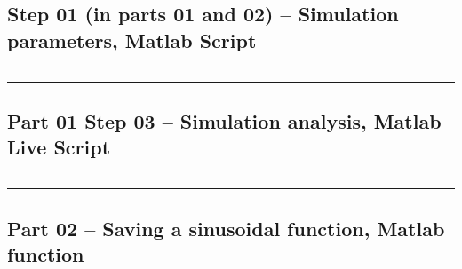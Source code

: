 \documentclass[12pt]{article}
\def\hr{{\par\noindent\rule{\textwidth}{0.4pt}}}
\begin{document}
\subsection{Step 01 (in parts 01 and 02) -- Simulation parameters, Matlab Script}\label{sap:simulation params}
\inputminted{matlab}{step01_simulation_params.m}

\hr

\subsection{Part 01 Step 03 -- Simulation analysis, Matlab Live Script}\label{sap:simulation analysis mlx}
\inputminted{matlab}{step03_simulation_analysis_mlx.m}

\hr

\subsection{Part 02 -- Saving a sinusoidal function, Matlab function}\label{sap:save sinusoid}
\inputminted{matlab}{part02_save_sinusoid.m}
\end{document}
